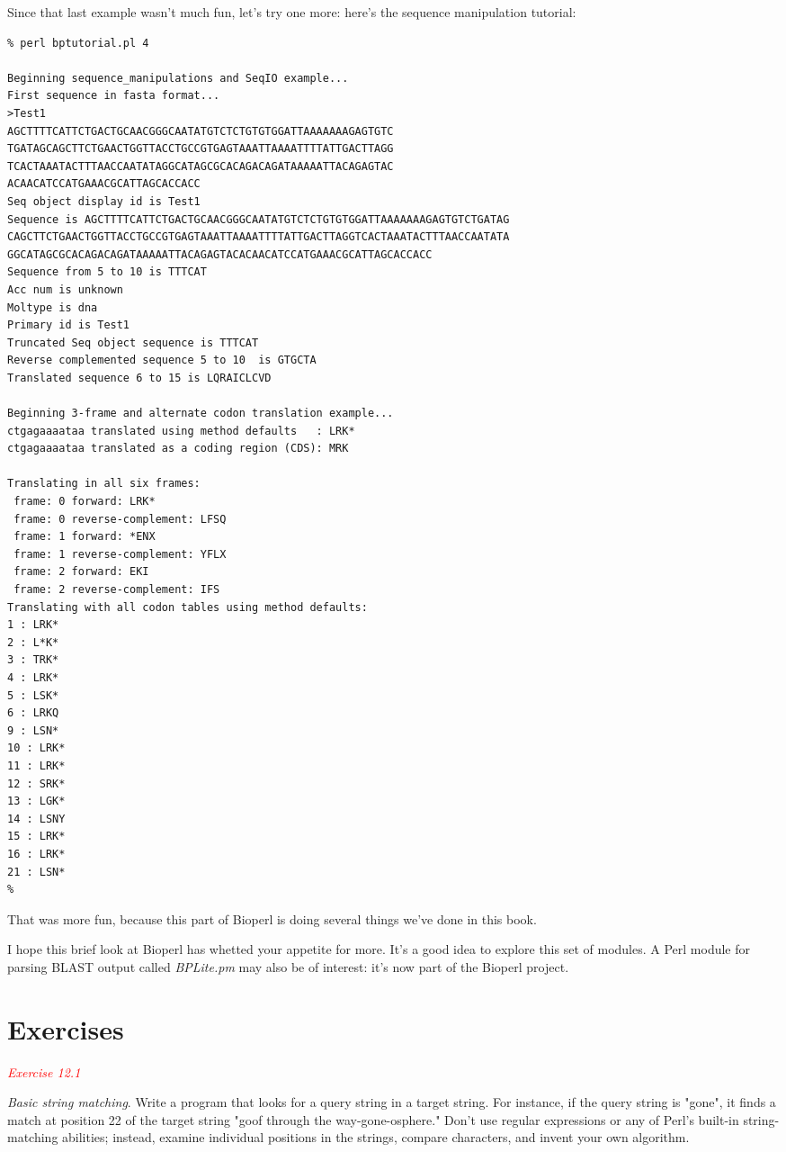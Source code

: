 Since that last example wasn't much fun, let's try one more: here's the sequence manipulation tutorial: 

\begin{lstlisting}
% perl bptutorial.pl 4

Beginning sequence_manipulations and SeqIO example... 
First sequence in fasta format... 
>Test1
AGCTTTTCATTCTGACTGCAACGGGCAATATGTCTCTGTGTGGATTAAAAAAAGAGTGTC
TGATAGCAGCTTCTGAACTGGTTACCTGCCGTGAGTAAATTAAAATTTTATTGACTTAGG
TCACTAAATACTTTAACCAATATAGGCATAGCGCACAGACAGATAAAAATTACAGAGTAC
ACAACATCCATGAAACGCATTAGCACCACC
Seq object display id is Test1
Sequence is AGCTTTTCATTCTGACTGCAACGGGCAATATGTCTCTGTGTGGATTAAAAAAAGAGTGTCTGATAG
CAGCTTCTGAACTGGTTACCTGCCGTGAGTAAATTAAAATTTTATTGACTTAGGTCACTAAATACTTTAACCAATATA
GGCATAGCGCACAGACAGATAAAAATTACAGAGTACACAACATCCATGAAACGCATTAGCACCACC 
Sequence from 5 to 10 is TTTCAT 
Acc num is unknown 
Moltype is dna 
Primary id is Test1 
Truncated Seq object sequence is TTTCAT 
Reverse complemented sequence 5 to 10  is GTGCTA  
Translated sequence 6 to 15 is LQRAICLCVD 

Beginning 3-frame and alternate codon translation example... 
ctgagaaaataa translated using method defaults   : LRK*
ctgagaaaataa translated as a coding region (CDS): MRK

Translating in all six frames:
 frame: 0 forward: LRK*
 frame: 0 reverse-complement: LFSQ
 frame: 1 forward: *ENX
 frame: 1 reverse-complement: YFLX
 frame: 2 forward: EKI
 frame: 2 reverse-complement: IFS
Translating with all codon tables using method defaults:
1 : LRK*
2 : L*K*
3 : TRK*
4 : LRK*
5 : LSK*
6 : LRKQ
9 : LSN*
10 : LRK*
11 : LRK*
12 : SRK*
13 : LGK*
14 : LSNY
15 : LRK*
16 : LRK*
21 : LSN*
% 
\end{lstlisting}

That was more fun, because this part of Bioperl is doing several things we've done in this book.

I hope this brief look at Bioperl has whetted your appetite for more.  It's a good idea to explore this set of modules. A Perl module for parsing BLAST output called \textit{BPLite.pm} may also be of interest: it's now part of the Bioperl project. 

\section{Exercises}
\textcolor{red}{\textit{Exercise 12.1}}
\begin{adjustwidth}{1cm}{}
  \textit{Basic string matching}. Write a program that looks for a query string in a target string. For instance, if the query string is "gone", it finds a match at position 22 of the target string "goof through the way-gone-osphere." Don't use regular expressions or any of Perl's built-in string-matching abilities; instead, examine individual positions in the strings, compare characters, and invent your own algorithm. 
\end{adjustwidth}

